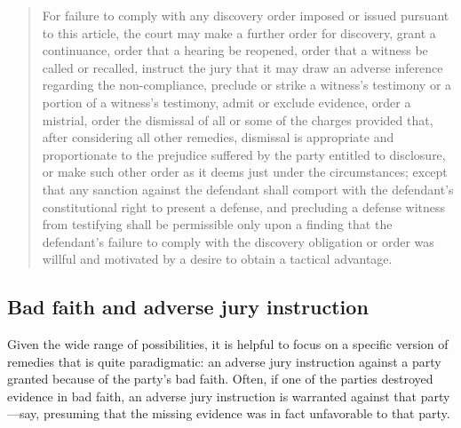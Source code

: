 \documentclass[
  10pt,
  dvipsnames,enabledeprecatedfontcommands]{scrartcl}
\begin{document}
\begin{quote}
For failure to comply with any discovery order imposed or issued
pursuant to this article, the court may make a further order for
discovery, grant a continuance, order that a hearing be reopened, order
that a witness be called or recalled, instruct the jury that it may draw
an adverse inference regarding the non-compliance, preclude or strike a
witness's testimony or a portion of a witness's testimony, admit or
exclude evidence, order a mistrial, order the dismissal of all or some
of the charges provided that, after considering all other remedies,
dismissal is appropriate and proportionate to the prejudice suffered by
the party entitled to disclosure, or make such other order as it deems
just under the circumstances; except that any sanction against the
defendant shall comport with the defendant's constitutional right to
present a defense, and precluding a defense witness from testifying
shall be permissible only upon a finding that the defendant's failure to
comply with the discovery obligation or order was willful and motivated
by a desire to obtain a tactical advantage.
\end{quote}

\hypertarget{bad-faith-and-adverse-jury-instruction}{%
\subsection{Bad faith and adverse jury
instruction}\label{bad-faith-and-adverse-jury-instruction}}

Given the wide range of possibilities, it is helpful to focus on a
specific version of remedies that is quite paradigmatic: an adverse jury
instruction against a party granted because of the party's bad faith.
Often, if one of the parties destroyed evidence in bad faith, an adverse
jury instruction is warranted against that party---say, presuming that
the missing evidence was in fact unfavorable to that party.
\end{document}

